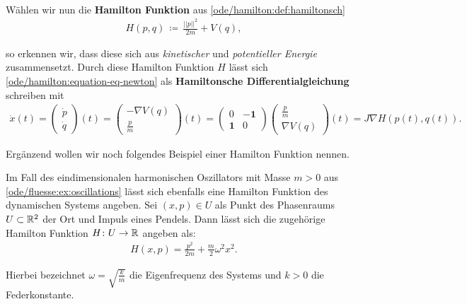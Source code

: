 \begin{example}{}{}
\begin{align}
\end{align}
\par
Wählen wir nun die \textbf{Hamilton Funktion} aus \cref{ode/hamilton:def:hamiltonsch} \begin{align*}
H(p,q) \, \coloneqq \, \frac{||p||^2}{2m} + V(q),
\end{align*}
\par
so erkennen wir, dass diese sich aus \emph{kinetischer} und \emph{potentieller Energie} zusammensetzt.
Durch diese Hamilton Funktion \(H\) lässt sich \cref{ode/hamilton:equation-eq-newton} als \textbf{Hamiltonsche Differentialgleichung} schreiben mit
\begin{align*}
\dot{x}(t) = \begin{pmatrix}\dot{p} \\ \dot{q} \end{pmatrix}(t) = \begin{pmatrix} -\nabla V(q) \\ \frac{p}{m} \end{pmatrix}(t) = \begin{pmatrix}0 & -\mathbf{1}\\ \mathbf{1} & 0 \end{pmatrix} \begin{pmatrix} \frac{p}{m} \\ \nabla V(q) \end{pmatrix}(t) = J \nabla H(p(t),q(t)).
\end{align*}\end{example}

\par
Ergänzend wollen wir noch folgendes Beispiel einer Hamilton Funktion nennen.
\label{ode/hamilton:example-4}
\begin{example}{}{}



\par
Im Fall des eindimensionalen harmonischen Oszillators mit Masse \(m > 0\) aus \cref{ode/fluesse:ex:oscillations} lässt sich ebenfalls eine Hamilton Funktion des dynamischen Systems angeben.
Sei \((x,p) \in U\) als Punkt des Phasenraums \(U \subset \mathbb{R}^2\) der Ort und Impuls eines Pendels.
Dann lässt sich die zugehörige Hamilton Funktion \(H \colon U \rightarrow \mathbb{R}\) angeben als:
\begin{align*}
H(x,p) = \frac{p^2}{2m} + \frac{m}{2} \omega^2 x^2.
\end{align*}
\par
Hierbei bezeichnet \(\omega = \sqrt{\frac{k}{m}}\) die Eigenfrequenz des Systems und \(k > 0\) die Federkonstante.
\end{example}

